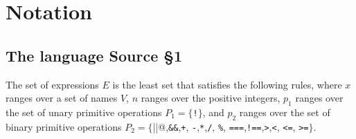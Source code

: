 

\newcommand{\Rule}[2]{\genfrac{}{}{0.7pt}{}{{\setlength{\fboxrule}{0pt}\setlength{\fboxsep}{3mm}\fbox{$#1$}}}{{\setlength{\fboxrule}{0pt}\setlength{\fboxsep}{3mm}\fbox{$#2$}}}}

\newcommand{\TruE}{\textbf{\texttt{true}}}
\newcommand{\FalsE}{\textbf{\texttt{false}}}
\newcommand{\AndOp}{\texttt{\&\&}}
\newcommand{\OrOp}{\texttt{||}}
\newcommand{\ThenOp}{\texttt{?}}
\newcommand{\ElseOp}{\texttt{:}}
\newcommand{\Rc}{\texttt{\}}}
\newcommand{\Lc}{\texttt{\{}}
\newcommand{\Rp}{\texttt{)}}
\newcommand{\Lp}{\texttt{(}}
\newcommand{\Fun}{\textbf{\texttt{function}}}
\newcommand{\Let}{\textbf{\texttt{let}}}
\newcommand{\Return}{\textbf{\texttt{return}}}
\newcommand{\Const}{\textbf{\texttt{const}}}
\newcommand{\If}{\textbf{\texttt{if}}}
\newcommand{\Else}{\textbf{\texttt{else}}}
\newcommand{\Bool}{\texttt{bool}}
\newcommand{\Number}{\texttt{number}}
\newcommand{\String}{\texttt{string}}
\newcommand{\Undefined}{\texttt{undefined}}
\newcommand{\Pred}{\textit{Pred}}
\newcommand{\type}{\textit{type}}
\newcommand{\polytype}{\textit{polytype}}
\newcommand{\predtype}{\textit{predtype}}
\newcommand{\ExtractPos}{\ensuremath{\textit{Extract}^+}}
\newcommand{\ExtractNeg}{\ensuremath{\textit{Extract}^-}}

\newtheorem{definition}{Definition}[section]




\section{Notation}  

\subsection{The language Source \S 1}

The set of expressions $E$ is the least set that satisfies the following rules, 
where $x$ ranges over a set of names $V$, $n$ ranges over the positive integers, 
$p_1$ ranges over the set of unary primitive operations 
$P_1 = \{$\verb#!#$\}$, and $p_2$ ranges over the set of binary 
primitive operations
$P_2 = \{$\verb@||@,\verb#&&#,\verb#+#,
\verb#-#,\verb#*#,\verb#/#, \verb#%#, \verb#===#,\verb#!==#,\verb#>#,\verb#<#, \verb#<=#, \verb#>=#$\}$.

